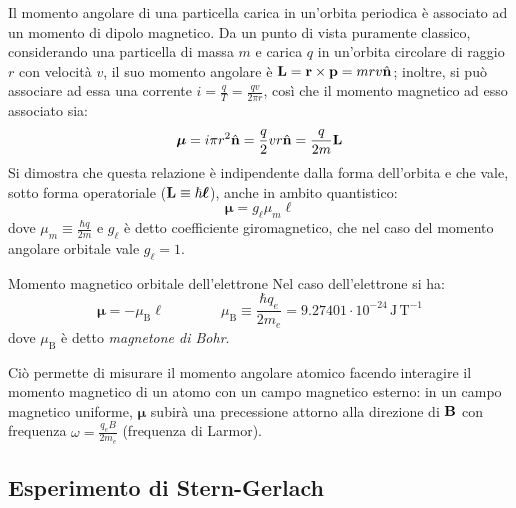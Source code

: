 Il momento angolare di una particella carica in un'orbita periodica è associato ad un momento di dipolo magnetico. Da un punto di vista puramente classico, considerando una particella di massa $ m $ e carica $ q $ in un'orbita circolare di raggio $ r $ con velocità $ v $, il suo momento angolare è $ \mathbf{L} = \mathbf{r} \times \mathbf{p} = mrv \hat{\mathbf{n}} $; inoltre, si può associare ad essa una corrente $ i = \frac{q}{T} = \frac{qv}{2\pi r} $, così che il momento magnetico ad esso associato sia:
\begin{equation*}
	\boldsymbol{\mu} = i \pi r^2 \hat{\mathbf{n}} = \frac{q}{2} vr \hat{\mathbf{n}} = \frac{q}{2m} \mathbf{L}
\end{equation*}
Si dimostra che questa relazione è indipendente dalla forma dell'orbita e che vale, sotto forma operatoriale ($ \mathbf{L} \equiv \hbar \boldsymbol{\ell} $), anche in ambito quantistico:
\begin{equation}
	\boldsymbol{\mu} = g_\ell \mu_m \boldsymbol{\ell}
\end{equation}
dove $ \mu_m \equiv \frac{\hbar q}{2m} $ e $ g_\ell $ è detto coefficiente giromagnetico, che nel caso del momento angolare orbitale vale $ g_\ell = 1 $.

\begin{example}{Momento magnetico orbitale dell'elettrone}{}
	Nel caso dell'elettrone si ha:
	\begin{equation*}
		\boldsymbol{\mu} = - \mu_\text{B} \boldsymbol{\ell}
		\qquad \qquad
		\mu_\text{B} \equiv \frac{\hbar q_e}{2m_e} = 9.27401 \cdot 10^{-24} \,\text{J}\,\text{T}^{-1}
	\end{equation*}
	dove $ \mu_\text{B} $ è detto \textit{magnetone di Bohr}.
\end{example}

Ciò permette di misurare il momento angolare atomico facendo interagire il momento magnetico di un atomo con un campo magnetico esterno: in un campo magnetico uniforme, $ \boldsymbol{\mu} $ subirà una precessione attorno alla direzione di $ \mathbf{B} $ con frequenza $ \omega = \frac{q_e B}{2m_e} $ (frequenza di Larmor).

\subsection{Esperimento di Stern-Gerlach}

